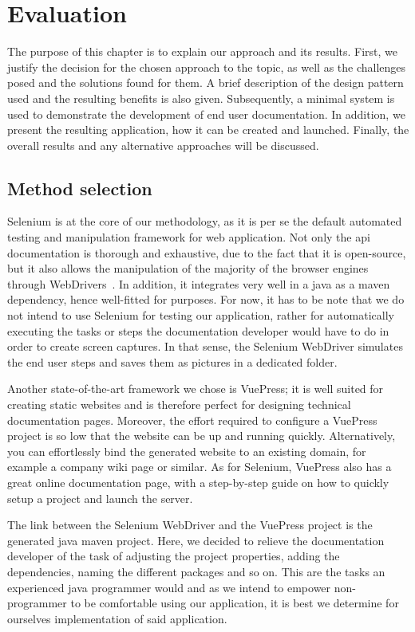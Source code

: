 \chapter{Evaluation}\label{ch:eval}
The purpose of this chapter is to explain our approach and its results. First, we justify the decision for the chosen approach to the topic, as well as the challenges posed and the solutions found for them. A brief description of the design pattern used and the resulting benefits is also given. Subsequently, a minimal system is used to demonstrate the development of end user documentation. In addition, we present the resulting application, how it can be created and launched. Finally, the overall results and any alternative approaches will be discussed.

\section{Method selection}\label{sec:meth}

Selenium is at the core of our methodology, as it is per se the default automated testing and manipulation framework for web application. Not only the \acrshort{api} documentation is thorough and exhaustive, due to the fact that it is open-source, but it also allows the manipulation of the majority of the browser engines through WebDrivers~\cite{sel}. In addition, it integrates very well in a java as a maven dependency, hence well-fitted for purposes. For now, it has to be note that we do not intend to use Selenium for testing our application, rather for automatically executing the tasks or steps the documentation developer would have to do in order to create screen captures. In that sense, the Selenium WebDriver simulates the end user steps and saves them as pictures in a dedicated folder.

Another state-of-the-art framework we chose is VuePress; it is well suited for creating static websites and is therefore perfect for designing technical documentation pages. Moreover, the effort required to configure a VuePress project is so low that the website can be up and running quickly. Alternatively, you can effortlessly bind the generated website to an existing domain, for example a company wiki page or similar. As for Selenium, VuePress also has a great online documentation page, with a step-by-step guide on how to quickly setup a project and launch the server.

The link between the Selenium WebDriver and the VuePress project is the generated java maven project. Here, we decided to relieve the documentation developer of the task of adjusting the project properties, adding the dependencies, naming the different packages and so on. This are the tasks an experienced java programmer would and as we intend to empower non-programmer to be comfortable using our application, it is best we determine for ourselves implementation of said application.


